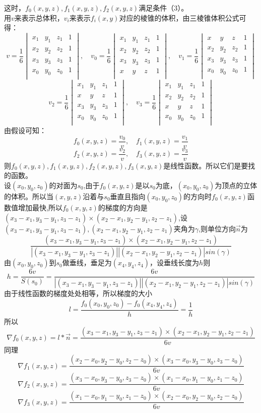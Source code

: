 \documentclass[12pt,a4paper]{article}
\begin{document}
这时，$f_0(x,y,z),f_1(x,y,z),f_2(x,y,z)$满足条件（3）。\\
用$v$来表示总体积，$v_i$来表示$f_i(x,y)$对应的棱锥的体积，由三棱锥体积公式可得：
$$
v=\frac{1}{6}\begin{vmatrix}
x_1&y_1&z_1&1\\
x_2&y_2&z_2&1\\
x_3&y_3&z_3&1\\
x_0&y_0&z_0&1\\
\end{vmatrix},\quad
v_0=\frac{1}{6}\begin{vmatrix}
x_1&y_1&z_1&1\\
x_2&y_2&z_2&1\\
x_3&y_3&z_3&1\\
x&y&z&1\\
\end{vmatrix},\quad
v_1=\frac{1}{6}\begin{vmatrix}
x&y&z&1\\
x_2&y_2&z_2&1\\
x_3&y_3&z_3&1\\
x_0&y_0&z_0&1\\
\end{vmatrix}
$$
$$
v_2=\frac{1}{6}\begin{vmatrix}
x_1&y_1&z_1&1\\
x&y&z&1\\
x_3&y_3&z_3&1\\
x_0&y_0&z_0&1\\
\end{vmatrix},\quad
v_3=\frac{1}{6}\begin{vmatrix}
x_1&y_1&z_1&1\\
x_2&y_2&z_2&1\\
x&y&z&1\\
x_0&y_0&z_0&1\\
\end{vmatrix}
$$
由假设可知：
$$
f_0(x,y,z)=\frac{v_0}{v},\quad f_1(x,y,z)=\frac{v_1}{v}
$$
$$
f_2(x,y,z)=\frac{v_2}{v},\quad f_3(x,y,z)=\frac{v_3}{v}
$$
则$f_0(x,y,z),f_1(x,y,z),f_2(x,y,z),f_3(x,y,z)$是线性函数。所以它们是要找的函数。\\
设$(x_0,y_0,z_0)$的对面为$s_0$,由于$f_0(x,y,z)$是以$s_0$为底，$(x_0,y_0,z_0)$为顶点的立体的体积。所以当$(x,y,z)$沿着与$s_0$垂直且指向$(x_0,y_0,z_0)$的方向时$f_0(x,y,z)$函数值增加最快,所以$f_0(x,y,z)$的梯度的方向是$(x_3-x_1,y_3-y_1,z_3-z_1)\times(x_2-x_1,y_2-y_1,z_2-z_1)$,设$(x_3-x_1,y_3-y_1,z_3-z_1),(x_2-x_1,y_2-y_1,z_2-z_1)$夹角为$\gamma$,则单位方向$\vec{n}$为
$$
\frac{(x_3-x_1,y_3-y_1,z_3-z_1)\times(x_2-x_1,y_2-y_1,z_2-z_1)}{|(x_3-x_1,y_3-y_1,z_3-z_1)||(x_2-x_1,y_2-y_1,z_2-z_1)|sin(\gamma)}
$$
由$(x_0,y_0,z_0)$到$s_0$做垂线，垂足为$(x_4,y_4,z_4)$，设垂线长度为$h$则
$$
h=\frac{6v}{S(s_0)}=\frac{6v}{|(x_3-x_1,y_3-y_1,z_3-z_1)||(x_2-x_1,y_2-y_1,z_2-z_1)|sin(\gamma)}
$$
由于线性函数的梯度处处相等，所以梯度的大小$$l=\frac{f_0(x_0,y_0,z_0)-f_0(x_4,y_4,z_4)}{h}=\frac{1}{h}$$
所以$$
\nabla f_0(x,y,z)=l*\vec{n}=\frac{(x_3-x_1,y_3-y_1,z_3-z_1)\times(x_2-x_1,y_2-y_1,z_2-z_1)}{6v}
$$
同理
$$
\nabla f_1(x,y,z)=\frac{(x_2-x_0,y_2-y_0,z_2-z_0)\times(x_3-x_0,y_3-y_0,z_3-z_0)}{6v}
$$
$$
\nabla f_2(x,y,z)=\frac{(x_3-x_0,y_3-y_0,z_3-z_0)\times(x_1-x_0,y_1-y_0,z_1-z_0)}{6v}
$$
$$
\nabla f_3(x,y,z)=\frac{(x_1-x_0,y_1-y_0,z_1-z_0)\times(x_2-x_0,y_2-y_0,z_2-z_0)}{6v}
$$
\end{document}
